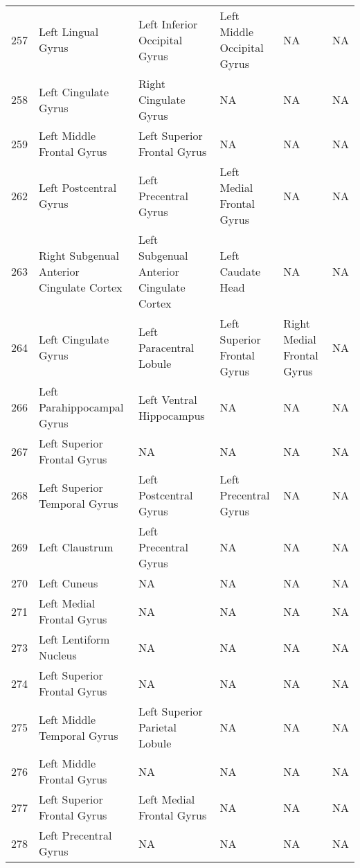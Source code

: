 \documentclass[10pt,letterpaper]{article}\usepackage[]{graphicx}\usepackage[]{color}
\begin{document}
\begin{center}
\begin{longtable}[c]{cp{1.1in}p{1.1in}p{1.1in}p{1.1in}p{1.1in}}
		257	& Left Lingual Gyrus & Left Inferior Occipital Gyrus & Left Middle Occipital Gyrus & NA	& NA \\
		258	& Left Cingulate Gyrus & Right Cingulate Gyrus & NA	& NA & NA \\
		259	& Left Middle Frontal Gyrus & Left Superior Frontal Gyrus & NA & NA	& NA \\
		262	& Left Postcentral Gyrus & Left Precentral Gyrus & Left Medial Frontal Gyrus & NA & NA \\
		263	& Right Subgenual Anterior Cingulate Cortex	& Left Subgenual Anterior Cingulate Cortex & Left Caudate Head & NA & NA \\
		264	& Left Cingulate Gyrus & Left Paracentral Lobule & Left Superior Frontal Gyrus & Right Medial Frontal Gyrus & NA \\
		266	& Left Parahippocampal Gyrus & Left Ventral Hippocampus	& NA & NA & NA \\
		267	& Left Superior Frontal Gyrus & NA & NA	& NA & NA \\
		268	& Left Superior Temporal Gyrus & Left Postcentral Gyrus	& Left Precentral Gyrus	& NA & NA \\
		269	& Left Claustrum & Left Precentral Gyrus & NA & NA & NA \\
		270	& Left Cuneus & NA & NA	& NA & NA \\
		271	& Left Medial Frontal Gyrus	& NA & NA & NA & NA \\
		273	& Left Lentiform Nucleus & NA & NA & NA	& NA \\
		274	& Left Superior Frontal Gyrus & NA & NA	& NA & NA \\
		275	& Left Middle Temporal Gyrus & Left Superior Parietal Lobule & NA & NA & NA \\
		276	& Left Middle Frontal Gyrus	& NA & NA & NA & NA \\
		277	& Left Superior Frontal Gyrus & Left Medial Frontal Gyrus & NA & NA	& NA \\
		278	& Left Precentral Gyrus	& NA & NA & NA & NA \\
	\end{longtable}
\end{center}
\end{document}
